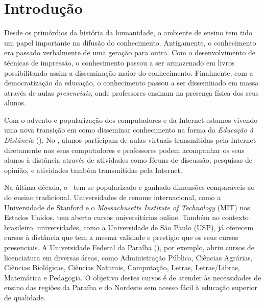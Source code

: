 \chapter{Introdu{\c c}{\~ a}o}

Desde os prim\'ordios da hist\'oria da humanidade, o ambiente de ensino tem tido um papel
importante na difus{\~ a}o do conhecimento. Antigamente, o conhecimento era passado
verbalmente de uma gera{\c c}{\~ a}o para outra. Com o desenvolvimento de t{\'e}cnicas de
impress{\~ a}o, o conhecimento
passou a ser armazenado em livros possibilitando assim a dissemina{\c c}{\~ a}o maior do conhecimento. 
Finalmente, com a democratiza{\c c}{\~ a}o da educa{\c c}{\~ a}o, o conhecimento passou a ser disseminado em massa 
atrav{\'e}s de aulas \emph{presenciais}, onde professores ensinam na presen{\c c}a f{\' i}sica dos seus alunos. 

Com o advento e populariza{\c c}{\~ a}o dos computadores e da Internet 
estamos vivendo uma nova transi{\c c}{\~ a}o em como disseminar conhecimento na forma da \emph{Educa{\c c}{\~ a}o {\`a} Dist{\^ a}ncia} (\ead). 
No \ead, alunos participam de aulas virtuais transmitidas pela Internet
diretamente nos seus computadores
e professores podem acompanhar os seus alunos {\`a} dist{\^ a}ncia atrav{\'e}s de atividades como 
f\'oruns de discuss{\~ a}o, pesquisas de opini{\~ a}o, e atividades tamb{\'e}m transmitidas
pela Internet.

Na {\' u}ltima d{\'e}cada, o \ead\ tem se popularizado e ganhado dimens{\~ o}es compar{\' a}veis ao do ensino 
tradicional. Universidades de renome internacional, como a Universidade de Stanford e o \emph{Massachusetts Institute of 
Technology} (MIT) nos Estados Unidos, tem aberto cursos universit{\' a}rios online. Tamb{\'e}m no contexto brasileiro, 
universidades, como a Universidade de S{\~ a}o Paulo (USP), j{\' a} oferecem cursos 
{\`a} dist{\^ a}ncia que tem a mesma validade e prest{\' i}gio que os seus cursos presenciais. 
A Universidade Federal da Para{\' i}ba (\ufpb), por exemplo, abriu cursos de licenciatura em 
diversas {\' a}reas, como Administra{\c c}{\~ a}o P{\' u}blica, Ciências Agr{\' a}rias, Ciências Biol\'ogicas, Ciências Naturais,
Computa{\c c}{\~ a}o, Letras, Letras/Libras, Matem{\' a}tica e Pedagogia. O objetivo destes cursos
{\'e} de atender {\`a}s necessidades de ensino das regi{\~ o}es da Para{\' i}ba e do Nordeste sem acesso f{\' a}cil
{\`a} educa{\c c}{\~ a}o superior de qualidade. 

